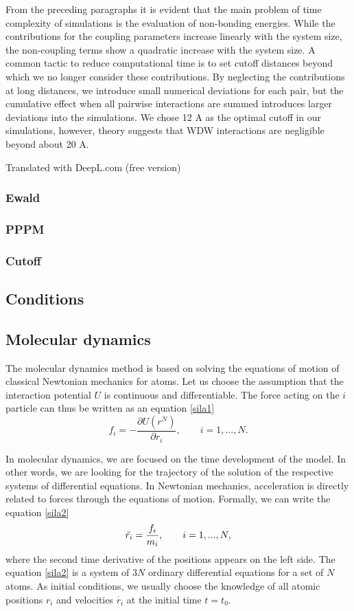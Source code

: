 From the preceding paragraphs it is evident that the main problem of time complexity of simulations is the evaluation of non-bonding energies. While the contributions for the coupling parameters increase linearly with the system size, the non-coupling terms show a quadratic increase with the system size. A common tactic to reduce computational time is to set cutoff distances beyond which we no longer consider these contributions. By neglecting the contributions at long distances, we introduce small numerical deviations for each pair, but the cumulative effect when all pairwise interactions are summed introduces larger deviations into the simulations. We chose 12 A as the optimal cutoff in our simulations, however, theory suggests that WDW interactions are negligible beyond about 20 A. 

Translated with DeepL.com (free version)
\subsubsection{Ewald}
\subsubsection{PPPM}
\subsubsection{Cutoff}
\subsection{Conditions}


\subsection{Molecular dynamics}
The molecular dynamics method is based on solving the equations of motion of classical Newtonian mechanics for atoms. Let us choose the assumption that the interaction potential $U$ is continuous and differentiable. The force acting on the $i$ particle can thus be written as an equation \ref{sila1} 
\begin{equation}\label{sila1}
	f_i=-\frac{\partial U(r^N)}{\partial r_i}, \qquad i=1,...,N.
\end{equation}

In molecular dynamics, we are focused on the time development of the model. In other words, we are looking for the trajectory of the solution of the respective systems of differential equations. In Newtonian mechanics, acceleration is directly related to forces through the equations of motion. Formally, we can write the equation \ref{sila2}
\begin{equation}\label{sila2}
	\Ddot{r_i}=\frac{f_i}{m_i}, \qquad i=1,...,N,
\end{equation}
where the second time derivative of the positions appears on the left side. The equation \ref{sila2} is a system of 3$N$ ordinary differential equations for a set of $N$ atoms. As initial conditions, we usually choose the knowledge of all atomic positions $r_i$ and velocities $\dot{r_i}$ at the initial time $t=t_0$. 

